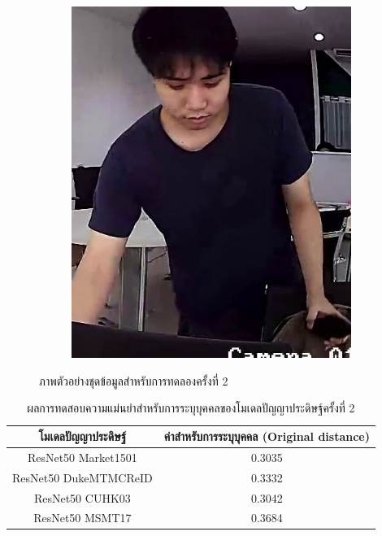 \begin{figure}[!ht]
\begin{subfigure}[b]{0.2\textwidth}
        \includegraphics[width=\textwidth]{chapter4/images/first_1.jpg}
        \label{fig:ex_4}
    \end{subfigure}
    \caption{ภาพตัวอย่างชุดข้อมูลสำหรับการทดลองครั้งที่ 2}
    \label{fig: ภาพตัวอย่างชุดข้อมูลสำหรับการทดลอง 2}
\end{figure}
\begin{table}[!ht]
    \centering
    \begin{tabular}{|c|c|}
            \hline
            {โมเดลปัญญาประดิษฐ์}&{ค่าสำหรับการระบุบุคคล (Original distance)}							\\
            \hline
            ResNet50 Market1501	 			& 0.3035								\\
            ResNet50 DukeMTMCReID			& 0.3332								\\
            ResNet50 CUHK03				& 0.3042								\\
            ResNet50 MSMT17				& 0.3684								\\
        \hline
    \end{tabular}
    \caption{ผลการทดสอบความแม่นยำสำหรับการระบุบุคคลของโมเดลปัญญาประดิษฐ์ครั้งที่ 2}
    \label{tab: Original distant of image 2}    
\end{table}

